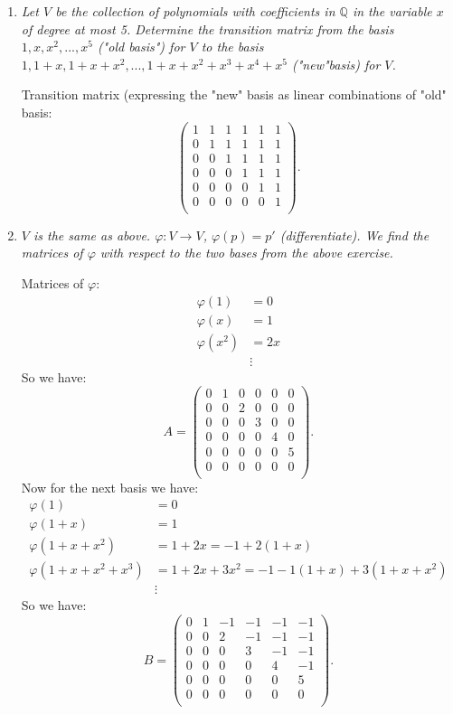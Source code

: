 \documentclass[9pt,reqno,twoside]{amsbook}
\theoremstyle{plain}
\numberwithin{section}{chapter}
\numberwithin{equation}{chapter}
\theoremstyle{definition}
\theoremstyle{remark}
\theoremstyle{plain}
\newcommand{\Q}{\mathbb{Q}}
\newcommand{\bee}{\begin{equation}\begin{aligned}}
\newcommand{\eee}{\end{aligned}\end{equation}}
\newcommand{\lpar}{\left(}
\newcommand{\rpar}{\right)}
\renewcommand{\phi}{\varphi}
\begin{document}
\begin{enumerate}[label=\arabic*.]

\item \textit{Let $V$ be the collection of polynomials with coefficients in $\Q$ in the variable $x$ of degree at most 5. Determine the transition matrix from the basis $1,x,x^2,...,x^5$ ("old basis") for $V$ to the basis $1, 1 + x, 1 + x + x^2, ...,1 + x+ x^2 + x^3 + x^4 + x^5$ ("new"basis) for $V$. }

Transition matrix (expressing the "new" basis as linear combinations of "old" basis: 
$$
\lpar 
\begin{matrix}
1 & 1 & 1 & 1& 1 & 1\\
0 & 1 & 1 & 1& 1 & 1\\
0 & 0 & 1 & 1& 1 & 1\\
0 & 0 & 0 & 1& 1 & 1\\
0 & 0 & 0 & 0& 1 & 1\\
0 & 0 & 0 & 0& 0 & 1\\
\end{matrix} \rpar. 
$$

\item \textit{$V$ is the same as above. $\phi:V \to V$, $\phi(p) = p'$ (differentiate). We find the matrices of $\phi$ with respect to the two bases from the above exercise. }

Matrices of $\phi$:
\bee
\phi(1) &= 0\\
\phi(x) &= 1\\
\phi(x^2) &= 2x\\
&\vdots
\eee
So we have: 
$$
A = \lpar 
\begin{matrix}
0 & 1 & 0 & 0 & 0 & 0\\
0 & 0 & 2 & 0 & 0 & 0\\
0 & 0 & 0 & 3 & 0 & 0\\
0 & 0 & 0 & 0 & 4 & 0\\
0 & 0 & 0 & 0 & 0 & 5\\
0 & 0 & 0 & 0 & 0 & 0\\
\end{matrix} \rpar .
$$
Now for the next basis we have:
\bee
\phi(1) &= 0\\
\phi(1 + x) &= 1\\
\phi(1 + x + x^2) &= 1 + 2x = -1 + 2(1 + x)\\
\phi(1 + x + x^2+ x^3) &= 1 + 2x + 3x^2 = -1 - 1(1 + x) + 3(1 + x + x^2)\\
&\vdots
\eee
So we have:
$$
B = \lpar 
\begin{matrix}
0 & 1 & -1 & -1 & -1 & -1\\
0 & 0 & 2 & -1 & -1 & -1\\
0 & 0 & 0 & 3 & -1 & -1\\
0 & 0 & 0 & 0 & 4 & -1\\
0 & 0 & 0 & 0 & 0 & 5\\
0 & 0 & 0 & 0 & 0 & 0\\
\end{matrix} \rpar .
$$


\end{enumerate}
\end{document}
